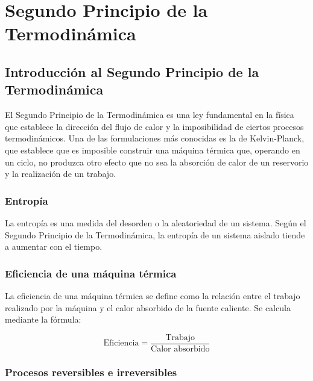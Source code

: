 \documentclass[../main]{subfiles}
\begin{document}
\chapter{Segundo Principio de la Termodinámica}

\section{Introducción al Segundo Principio de la Termodinámica}

El Segundo Principio de la Termodinámica es una ley fundamental en la física que establece la dirección del flujo de calor y la imposibilidad de ciertos procesos termodinámicos. Una de las formulaciones más conocidas es la de Kelvin-Planck, que establece que es imposible construir una máquina térmica que, operando en un ciclo, no produzca otro efecto que no sea la absorción de calor de un reservorio y la realización de un trabajo.


\subsection{Entropía}

La entropía es una medida del desorden o la aleatoriedad de un sistema. Según el Segundo Principio de la Termodinámica, la entropía de un sistema aislado tiende a aumentar con el tiempo.

\subsection{Eficiencia de una máquina térmica}

La eficiencia de una máquina térmica se define como la relación entre el trabajo realizado por la máquina y el calor absorbido de la fuente caliente. Se calcula mediante la fórmula:

\begin{equation}
    \text{Eficiencia} = \frac{\text{Trabajo}}{\text{Calor absorbido}}
\end{equation}

\subsection{Procesos reversibles e irreversibles}
\end{document}
